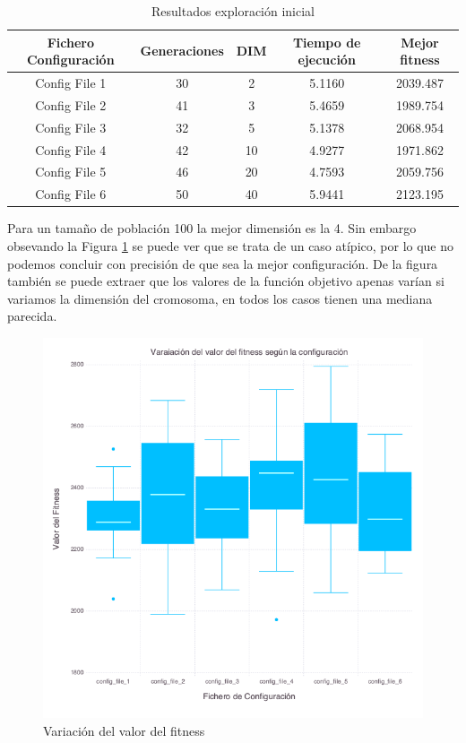 \begin{table}[]
    \centering
    \begin{tabular}{||c|c|c|c|c||}
        \hline
        \textbf{Fichero Configuración} & \textbf{Generaciones} & \textbf{DIM} & \textbf{Tiempo de ejecución} & \textbf{Mejor fitness} \\ \hline
        Config File 1   & 30    & 2   & 5.1160  & 2039.487   \\ \hline
        Config File 2   & 41    & 3   & 5.4659  & 1989.754   \\ \hline
        Config File 3   & 32    & 5   & 5.1378  & 2068.954   \\ \hline
        Config File 4   & 42    & 10  & 4.9277  & 1971.862   \\ \hline
        Config File 5   & 46    & 20  & 4.7593  & 2059.756   \\ \hline
        Config File 6   & 50    & 40  & 5.9441  & 2123.195   \\ \hline
    \end{tabular}
    \caption{Resultados exploración inicial}
    \label{tab:fitness_variation}
\end{table}


Para un tamaño de población 100 la mejor dimensión es la 4. Sin embargo obsevando la Figura \ref{fig:box_plots} se puede ver que se trata de
un caso atípico, por lo que no podemos concluir con precisión de que sea la mejor configuración. De la figura también se puede extraer que 
los valores de la función objetivo apenas varían si variamos la dimensión del cromosoma, en todos los casos tienen una mediana parecida.

\begin{figure}[]
	\centering	
	\includegraphics[scale=0.4]{figuras/config_file_1-6_Rastrigin_box_plots.png}
	\caption{ Variación del valor del fitness }
    \label{fig:box_plots}
\end{figure}

